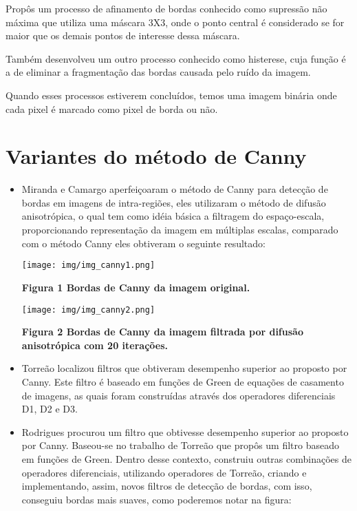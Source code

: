 \documentclass[a4paper,12pt]{article}
\begin{document}
Propôs um processo de afinamento de bordas conhecido como supressão não
máxima que utiliza uma máscara 3X3, onde o ponto central é considerado
se for maior que os demais pontos de interesse dessa máscara.

Também desenvolveu um outro processo conhecido como histerese, cuja função é a de
eliminar a fragmentação das bordas causada pelo ruído da imagem.

Quando esses processos estiverem concluídos, temos uma imagem binária onde cada
pixel é marcado como pixel de borda ou não.

\section{\textbf{Variantes do método de Canny}}
    
    \begin{itemize}
        \item Miranda e Camargo\cite{VAR1} aperfeiçoaram o método de Canny para detecção de
        bordas em imagens de intra-regiões, eles utilizaram o método de difusão
        anisotrópica, o qual tem como idéia básica a filtragem do espaço-escala,
        proporcionando representação da imagem em múltiplas escalas, comparado
        com o método Canny eles obtiveram o seguinte resultado:
            
        \texttt{[image: img/img\_canny1.png]}
    
        \textbf{Figura 1 Bordas de Canny da imagem original.}

        \texttt{[image: img/img\_canny2.png]}
        
        \textbf{Figura 2 Bordas de Canny da imagem filtrada por difusão
            anisotrópica com 20 iterações.}


        \item Torreão\cite{VAR2} localizou filtros que obtiveram desempenho
        superior ao proposto por Canny. Este filtro é baseado em funções
        de Green de equações de casamento de imagens, as quais foram
        construídas através dos operadores diferenciais D1, D2 e D3.

        \item Rodrigues\cite{VAR3} procurou um filtro que obtivesse
        desempenho superior ao proposto por Canny. Baseou-se no trabalho de
        Torreão\cite{VAR2} que propôs um filtro baseado em funções de Green.
        Dentro desse contexto, construiu outras combinações de operadores
        diferenciais, utilizando operadores de Torreão, criando e implementando,
        assim, novos filtros de detecção de bordas, com isso, conseguiu bordas
        mais suaves, como poderemos notar na figura:


\end{itemize}
\end{document}
